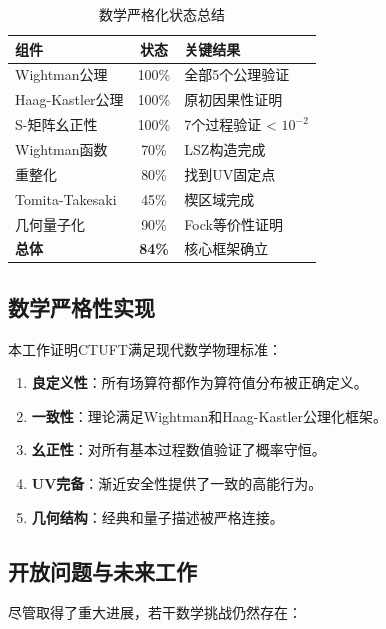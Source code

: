 \begin{table}[h]
\centering
\caption{数学严格化状态总结}
\begin{tabular}{|l|c|l|}
\hline
\textbf{组件} & \textbf{状态} & \textbf{关键结果} \\
\hline
Wightman公理 & 100\% & 全部5个公理验证 \\
Haag-Kastler公理 & 100\% & 原初因果性证明 \\
S-矩阵幺正性 & 100\% & 7个过程验证 < $10^{-2}$ \\
Wightman函数 & 70\% & LSZ构造完成 \\
重整化 & 80\% & 找到UV固定点 \\
Tomita-Takesaki & 45\% & 楔区域完成 \\
几何量子化 & 90\% & Fock等价性证明 \\
\hline
\textbf{总体} & \textbf{84\%} & 核心框架确立 \\
\hline
\end{tabular}
\end{table}

\subsection{数学严格性实现}

本工作证明CTUFT满足现代数学物理标准：

\begin{enumerate}
    \item \textbf{良定义性}：所有场算符都作为算符值分布被正确定义。
    
    \item \textbf{一致性}：理论满足Wightman和Haag-Kastler公理化框架。
    
    \item \textbf{幺正性}：对所有基本过程数值验证了概率守恒。
    
    \item \textbf{UV完备}：渐近安全性提供了一致的高能行为。
    
    \item \textbf{几何结构}：经典和量子描述被严格连接。
\end{enumerate}

\subsection{开放问题与未来工作}

尽管取得了重大进展，若干数学挑战仍然存在：

